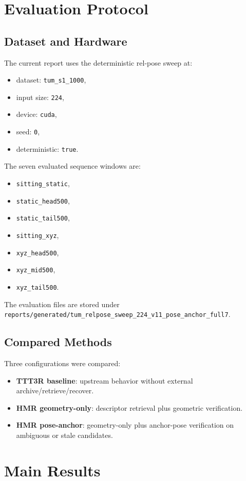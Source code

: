 \documentclass[11pt]{article}
\begin{document}
\section{Evaluation Protocol}
\subsection{Dataset and Hardware}
The current report uses the deterministic rel-pose sweep at:
\begin{itemize}
\item dataset: \texttt{tum\_s1\_1000},
\item input size: \texttt{224},
\item device: \texttt{cuda},
\item seed: \texttt{0},
\item deterministic: \texttt{true}.
\end{itemize}

The seven evaluated sequence windows are:
\begin{itemize}
\item \texttt{sitting\_static},
\item \texttt{static\_head500},
\item \texttt{static\_tail500},
\item \texttt{sitting\_xyz},
\item \texttt{xyz\_head500},
\item \texttt{xyz\_mid500},
\item \texttt{xyz\_tail500}.
\end{itemize}

The evaluation files are stored under
\texttt{reports/generated/tum\_relpose\_sweep\_224\_v11\_pose\_anchor\_full7}.

\subsection{Compared Methods}
Three configurations were compared:
\begin{itemize}
\item \textbf{TTT3R baseline}: upstream behavior without external archive/retrieve/recover.
\item \textbf{HMR geometry-only}: descriptor retrieval plus geometric verification.
\item \textbf{HMR pose-anchor}: geometry-only plus anchor-pose verification on
ambiguous or stale candidates.
\end{itemize}

\section{Main Results}
\end{document}
